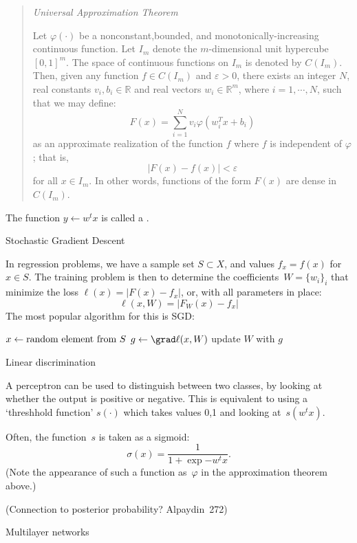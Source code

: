 \begin{quotation}
  \textsl{Universal Approximation Theorem}%

  Let $\varphi(\cdot)$ be a nonconstant,bounded, and
  monotonically-increasing continuous function. Let $I_m$ denote the
  $m$-dimensional unit hypercube $[0,1]^m$. The space
  of continuous functions on $I_m$ is denoted by
  $C(I_m)$. Then, given any function $f\in C(I_m)$
  and $\varepsilon>0$, there exists an integer
  $N$, real constants $v_i,b_i\in\mathbb{R}$ and
  real vectors $w_i \in \mathbb{R}^m$, where
  $i=1,\cdots,N$, such that we may define:
  \[
  F( x ) =
  \sum_{i=1}^{N} v_i \varphi \left( w_i^T x + b_i\right)
  \]
  as an approximate realization of the function $f$ where
  $f$ is independent of $\varphi$; that is,
  \[
  | F( x ) - f ( x ) | < \varepsilon
  \]
  for all $x\in I_m$. In other words, functions of the form
  $F(x)$ are dense in $C(I_m)$.
\end{quotation}

The function $y\leftarrow w^tx$ is called a .

 {Stochastic Gradient Descent}

In regression problems, we have a sample set $S\subset X$, and values
$f_x=f(x)$ for $x\in S$. The training problem is then to determine the
coefficients~$W=\{w_i\}_i$ that minimize the loss $\ell(x)=|F(x)-f_x|$,
or, with all parameters in place:
\[ \ell(x,W) = |F_W(x)-f_x| \]
The most popular algorithm for this is \acf{SGD}:
%
\begin{displayalgorithm}
        { $x\leftarrow\hbox{random element from $S$}$\;
          $g\leftarrow\grad \ell(x,W)$\;
          update $W$ with $g$\;
          }
\end{displayalgorithm}

 {Linear discrimination}

A perceptron can be used to distinguish between two classes, by
looking at whether the output is positive or negative. This is
equivalent to using a `threshhold function' $s(\cdot)$ which takes
values 0,1 and looking at~$s(w^tx)$.

Often, the function~$s$ is taken as a sigmoid:
\[ \sigma(x) = \frac1{1+\exp{-w^tx}}. \]
(Note the appearance of such a function as~$\varphi$ in the approximation theorem
above.)

(Connection to posterior probability? Alpaydin~272)

 {Multilayer networks}

